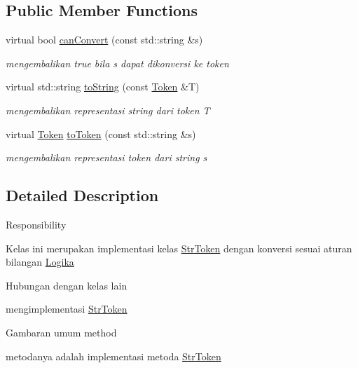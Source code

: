 \subsection*{Public Member Functions}
\begin{DoxyCompactItemize}
\item 
virtual bool \hyperlink{class_logika_acb038237bab7f8557b4da5e75eb0ce61}{can\-Convert} (const std\-::string \&s)
\begin{DoxyCompactList}\small\item\em mengembalikan true bila s dapat dikonversi ke token \end{DoxyCompactList}\item 
virtual std\-::string \hyperlink{class_logika_accacd24a0d83e98146edd43ab46c789a}{to\-String} (const \hyperlink{class_token}{Token} \&T)
\begin{DoxyCompactList}\small\item\em mengembalikan representasi string dari token T \end{DoxyCompactList}\item 
virtual \hyperlink{class_token}{Token} \hyperlink{class_logika_af52abd9fefcea94bedc313ce61987b3e}{to\-Token} (const std\-::string \&s)
\begin{DoxyCompactList}\small\item\em mengembalikan representasi token dari string s \end{DoxyCompactList}\end{DoxyCompactItemize}


\subsection{Detailed Description}
Responsibility\par
Kelas ini merupakan implementasi kelas \hyperlink{class_str_token}{Str\-Token} dengan konversi sesuai aturan bilangan \hyperlink{class_logika}{Logika}\par
Hubungan dengan kelas lain\par
mengimplementasi \hyperlink{class_str_token}{Str\-Token}\par
Gambaran umum method\par
metodanya adalah implementasi metoda \hyperlink{class_str_token}{Str\-Token}\par


